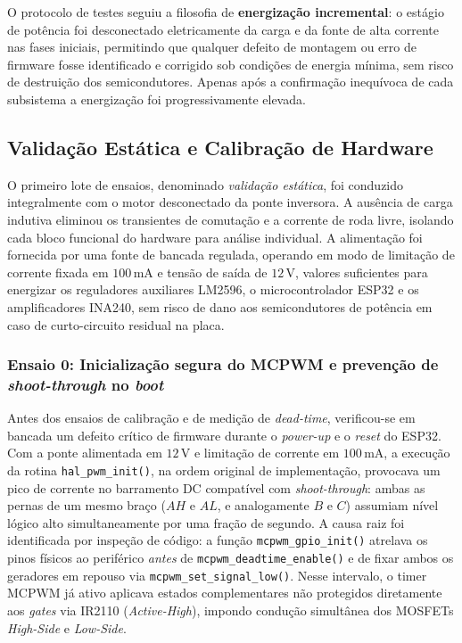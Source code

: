 O protocolo de testes seguiu a filosofia de \textbf{energização incremental}: o estágio de potência foi desconectado eletricamente da carga e da fonte de alta corrente nas fases iniciais, permitindo que qualquer defeito de montagem ou erro de firmware fosse identificado e corrigido sob condições de energia mínima, sem risco de destruição dos semicondutores. Apenas após a confirmação inequívoca de cada subsistema a energização foi progressivamente elevada.

\subsection{Validação Estática e Calibração de Hardware}

O primeiro lote de ensaios, denominado \textit{validação estática}, foi conduzido integralmente com o motor desconectado da ponte inversora. A ausência de carga indutiva eliminou os transientes de comutação e a corrente de roda livre, isolando cada bloco funcional do hardware para análise individual. A alimentação foi fornecida por uma fonte de bancada regulada, operando em modo de limitação de corrente fixada em $100\,\text{mA}$ e tensão de saída de $12\,\text{V}$, valores suficientes para energizar os reguladores auxiliares LM2596, o microcontrolador ESP32 e os amplificadores INA240, sem risco de dano aos semicondutores de potência em caso de curto-circuito residual na placa.

\subsubsection{Ensaio 0: Inicialização segura do MCPWM e prevenção de \textit{shoot-through} no \textit{boot}}
\label{subsubsec:ensaio0_mcpwm_boot}

Antes dos ensaios de calibração e de medição de \textit{dead-time}, verificou-se em bancada um defeito crítico de firmware durante o \textit{power-up} e o \textit{reset} do ESP32. Com a ponte alimentada em $12\,\text{V}$ e limitação de corrente em $100\,\text{mA}$, a execução da rotina \texttt{hal\_pwm\_init()}, na ordem original de implementação, provocava um pico de corrente no barramento DC compatível com \textit{shoot-through}: ambas as pernas de um mesmo braço ($AH$ e $AL$, e analogamente $B$ e $C$) assumiam nível lógico alto simultaneamente por uma fração de segundo. A causa raiz foi identificada por inspeção de código: a função \texttt{mcpwm\_gpio\_init()} atrelava os pinos físicos ao periférico \textit{antes} de \texttt{mcpwm\_deadtime\_enable()} e de fixar ambos os geradores em repouso via \texttt{mcpwm\_set\_signal\_low()}. Nesse intervalo, o timer MCPWM já ativo aplicava estados complementares não protegidos diretamente aos \textit{gates} via IR2110 (\textit{Active-High}), impondo condução simultânea dos MOSFETs \textit{High-Side} e \textit{Low-Side}.

